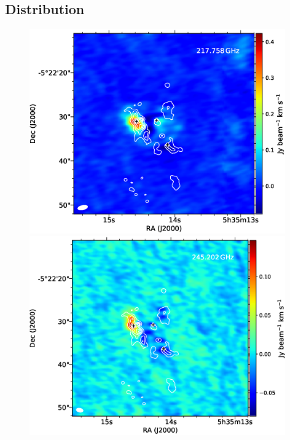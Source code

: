 \subsection{Distribution}

\begin{figure}[H] 
\begin{center}
\begin{minipage}{0.98\textwidth} 
\begin{center}
\begin{minipage}{0.48\textwidth}
\begin{center}
\includegraphics[width=0.98\textwidth]{OrionKL/mom0/217.758mom0_3-7.eps}
\end{center}
\end{minipage}
\begin{minipage}{0.48\textwidth}
\begin{center}
\includegraphics[width=0.98\textwidth]{OrionKL/mom0/245.202mom0_3-7.eps}
\end{center}
\end{minipage}
\end{center}
\end{minipage}


\end{center}
\end{figure}
